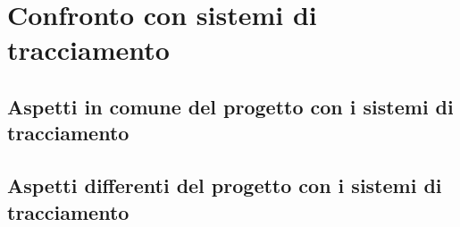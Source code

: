 \chapter{Confronto con sistemi di tracciamento}

\begin{preamble}
{\em

}
\end{preamble}

\section{Aspetti in comune del progetto con i sistemi di tracciamento}
\section{Aspetti differenti del progetto con i sistemi di tracciamento}